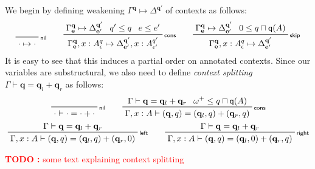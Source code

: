 \documentclass[acmsmall,screen,review]{acmart}
\newcounter{todos}
\newcommand{\TODO}[1]{{
  \stepcounter{todos}
  \begin{center}\large{\textcolor{red}{\textbf{TODO \arabic{todos}:} #1}}\end{center}
}}
\newcommand{\mb}[1]{\ensuremath{\mathbf{#1}}}
\newcommand{\ms}[1]{\ensuremath{\mathsf{#1}}}
\newcommand{\qsp}[4]{#1 \vdash #2 = #3 + #4}
\newcommand{\cwk}[2]{#1 \mapsto #2}
\newcommand{\rle}[1]{{\scriptsize\textsf{#1}}}
\newcommand{\zeroq}{0}
\newcommand{\cpyq}{\omega^+}
\newcommand{\alquant}{\ms{q}}
\begin{document}
We begin by defining weakening $\cwk{\Gamma^{\mb{q}}}{\Delta^{\mb{q}'}}$ of contexts as follows:
\begin{gather*}
  \prftree[r]{\rle{nil}}{\cwk{\cdot}{\cdot}} \qquad 
  \prftree[r]{\rle{cons}}
    {\cwk{\Gamma^{\mb{q}}_{\mb{e}}}{\Delta^{\mb{q}'}_{\mb{e}'}}}
    {q' \leq q}
    {e \leq e'}
    {\cwk{\Gamma^{\mb{q}}_{\mb{e}}, x : A^q_\epsilon}
         {\Delta^{\mb{q}'}_{\mb{e}'}, x : A^{q'}_{\epsilon'}}} \qquad
  \prftree[r]{\rle{skip}}
    {\cwk{\Gamma^{\mb{q}}_{\mb{e}}}{\Delta^{\mb{q}'}_{\mb{e}'}}}
    {\zeroq \leq q \sqcap \alquant(A)}
    {\cwk{\Gamma^{\mb{q}}_{\mb{e}}, x : A^q_\epsilon}{\Delta}^{\mb{q}'}_{\mb{e}'}}
\end{gather*}
It is easy to see that this induces a partial order on annotated contexts. Since our variables are
substructural, we also need to define \emph{context splitting}
$\qsp{\Gamma}{\mb{q}}{\mb{q}_l}{\mb{q}_r}$ as follows:
\begin{gather*}
  \prftree[r]{\rle{nil}}
    {\qsp{\cdot}{\cdot}{\cdot}{\cdot}} \qquad
  \prftree[r]{\rle{cons}}
    {\qsp{\Gamma}{\mb{q}}{\mb{q}_l}{\mb{q}_r}}
    {\cpyq \leq q \sqcap \alquant(A)}
    {\qsp{\Gamma, x : A}{(\mb{q}, q)}{(\mb{q}_l, q)}{(\mb{q}_r, q)}}
    \\
  \prftree[r]{\rle{left}}
    {\qsp{\Gamma}{\mb{q}}{\mb{q}_l}{\mb{q}_r}}
    {\qsp{\Gamma, x : A}{(\mb{q}, q)}{(\mb{q}_l, q)}{(\mb{q}_r, \zeroq)}} \qquad
  \prftree[r]{\rle{right}}
    {\qsp{\Gamma}{\mb{q}}{\mb{q}_l}{\mb{q}_r}}
    {\qsp{\Gamma, x : A}{(\mb{q}, q)}{(\mb{q}_l, \zeroq)}{(\mb{q}_r, q)}}
\end{gather*}
\TODO{some text explaining context splitting}
\end{document}
